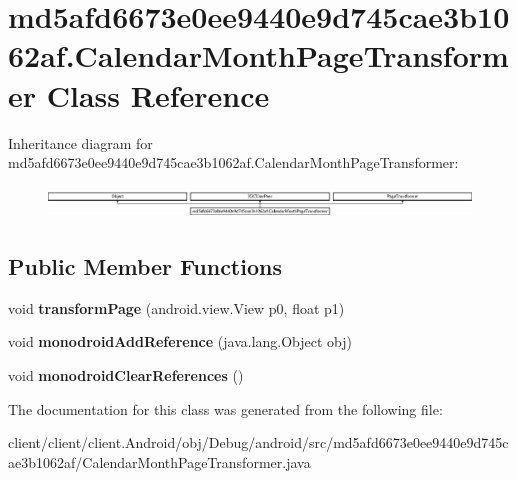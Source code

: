 \hypertarget{classmd5afd6673e0ee9440e9d745cae3b1062af_1_1CalendarMonthPageTransformer}{}\section{md5afd6673e0ee9440e9d745cae3b1062af.\+Calendar\+Month\+Page\+Transformer Class Reference}
\label{classmd5afd6673e0ee9440e9d745cae3b1062af_1_1CalendarMonthPageTransformer}
Inheritance diagram for md5afd6673e0ee9440e9d745cae3b1062af.\+Calendar\+Month\+Page\+Transformer\+:\begin{figure}[H]
\begin{center}
\leavevmode
\includegraphics[height=0.829630cm]{classmd5afd6673e0ee9440e9d745cae3b1062af_1_1CalendarMonthPageTransformer}
\end{center}
\end{figure}
\subsection*{Public Member Functions}
\begin{DoxyCompactItemize}
\item 
\hypertarget{classmd5afd6673e0ee9440e9d745cae3b1062af_1_1CalendarMonthPageTransformer_a3ffaef993553c395f1a7bf520f0cd16c}{}void {\bfseries transform\+Page} (android.\+view.\+View p0, float p1)\label{classmd5afd6673e0ee9440e9d745cae3b1062af_1_1CalendarMonthPageTransformer_a3ffaef993553c395f1a7bf520f0cd16c}

\item 
\hypertarget{classmd5afd6673e0ee9440e9d745cae3b1062af_1_1CalendarMonthPageTransformer_a4d41621949e5d8776c0298c4f16005c5}{}void {\bfseries monodroid\+Add\+Reference} (java.\+lang.\+Object obj)\label{classmd5afd6673e0ee9440e9d745cae3b1062af_1_1CalendarMonthPageTransformer_a4d41621949e5d8776c0298c4f16005c5}

\item 
\hypertarget{classmd5afd6673e0ee9440e9d745cae3b1062af_1_1CalendarMonthPageTransformer_a947f9f0e1095261902b736a1a3c4c463}{}void {\bfseries monodroid\+Clear\+References} ()\label{classmd5afd6673e0ee9440e9d745cae3b1062af_1_1CalendarMonthPageTransformer_a947f9f0e1095261902b736a1a3c4c463}

\end{DoxyCompactItemize}


The documentation for this class was generated from the following file\+:\begin{DoxyCompactItemize}
\item 
client/client/client.\+Android/obj/\+Debug/android/src/md5afd6673e0ee9440e9d745cae3b1062af/Calendar\+Month\+Page\+Transformer.\+java\end{DoxyCompactItemize}
